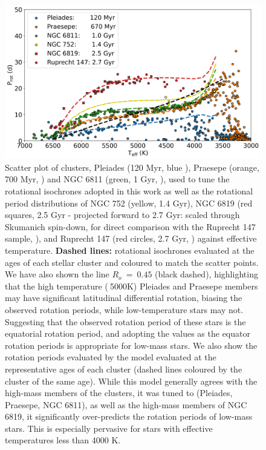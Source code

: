 \begin{figure}
\centering
 \includegraphics[width=\textwidth]{Figures/rot_gap_figures/com_gap_clus.png}
 \caption[Cluster rotation periods distributions against effective temperature.]{Scatter plot of clusters, Pleiades (120 Myr, blue \citep{rebull_rotation_2016}), Praesepe (orange, 700 Myr, \citep{douglas_poking_2017, douglas_k2_2019}) and NGC 6811 (green, 1 Gyr, \citep{curtis_temporary_2019}), used to tune the rotational isochrones adopted in this work \citep{spada_competing_2020} as well as the rotational period distributions of NGC 752 (yellow, 1.4 Gyr), NGC 6819 (red squares, 2.5 Gyr - projected forward to 2.7 Gyr: scaled through Skumanich spin-down, for direct comparison with the Ruprecht 147 sample, \citep{meibom_kepler_2011}), and Ruprecht 147 (red circles, 2.7 Gyr, \citep{curtis_when_2020}) against effective temperature. \textbf{Dashed lines:} \citep{spada_competing_2020} rotational isochrones evaluated at the ages of each stellar cluster and coloured to match the scatter points. We have also shown the line $R_o \ = \ 0.45$ (black dashed), highlighting that the high temperature ($\>$5000K) Pleiades and Praesepe members may have significant latitudinal differential rotation, biasing the observed rotation periods, while low-temperature stars may not. Suggesting that the observed rotation period of these stars is the equatorial rotation period, and adopting the \citet{spada_competing_2020} values as the equator rotation periods is appropriate for low-mass stars. We also show the rotation periods evaluated by the \citet{spada_competing_2020} model evaluated at the representative ages of each cluster (dashed lines coloured by the cluster of the same age).
While this model generally agrees with the high-mass members of the clusters, it was tuned to (Pleiades, Praesepe, NGC 6811), as well as the high-mass members of NGC 6819, it significantly over-predicts the rotation periods of low-mass stars.
This is especially pervasive for stars with effective temperatures less than 4000 K.}
 \label{fig:com_gap_clus}
\end{figure}

